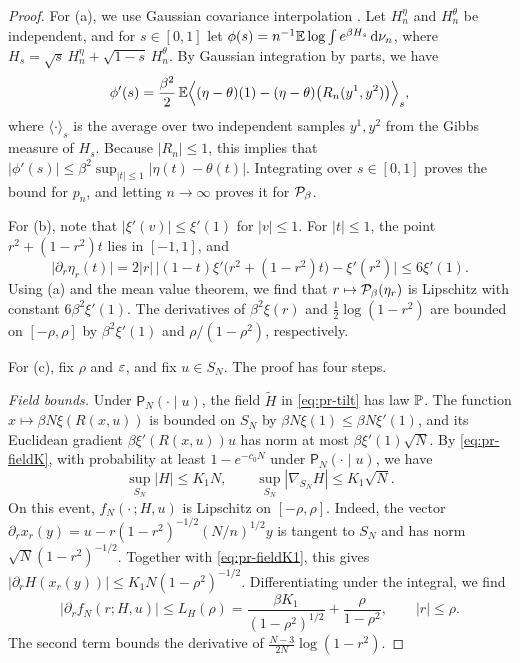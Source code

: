 \begin{proof}
For (a), we use Gaussian covariance interpolation \cite[Section~1.3, Lemma~1.3.1, and Eqs.~(1.55)--(1.60)]{Talagrand2011Volume1}. Let $H_n^\eta$ and $H_n^\theta$ be independent, and for $s\in[0,1]$ let $\phi(s)=n^{-1}\mathbb E\log\int e^{\beta H_s}\,\mathrm d\nu_n$, where $H_s=\sqrt s\,H_n^\eta+\sqrt{1-s}\,H_n^\theta$. By Gaussian integration by parts, we have
\[
\phi'(s)=\frac{\beta^2}{2}\,\mathbb E\Bigl\langle(\eta-\theta)(1)-(\eta-\theta)\bigl(R_n(y^1,y^2)\bigr)\Bigr\rangle_s ,
\]
where $\langle\cdot\rangle_s$ is the average over two independent samples $y^1,y^2$ from the Gibbs measure of $H_s$. Because $|R_n|\le1$, this implies that $|\phi'(s)|\le\beta^2\sup_{|t|\le1}|\eta(t)-\theta(t)|$. Integrating over $s\in[0,1]$ proves the bound for $p_n$, and letting $n\to\infty$ proves it for $\mathcal P_\beta$.

For (b), note that $|\xi'(v)|\le\xi'(1)$ for $|v|\le1$. For $|t|\le1$, the point $r^2+(1-r^2)t$ lies in $[-1,1]$, and
\[
\bigl|\partial_r\eta_r(t)\bigr|=2|r|\,\bigl|(1-t)\xi'\bigl(r^2+(1-r^2)t\bigr)-\xi'(r^2)\bigr|\le 6\xi'(1).
\]
Using (a) and the mean value theorem, we find that $r\mapsto\mathcal P_\beta(\eta_r)$ is Lipschitz with constant $6\beta^2\xi'(1)$. The derivatives of $\beta^2\xi(r)$ and $\frac12\log(1-r^2)$ are bounded on $[-\rho,\rho]$ by $\beta^2\xi'(1)$ and $\rho/(1-\rho^2)$, respectively.

For (c), fix $\rho$ and $\varepsilon$, and fix $u\in S_N$. The proof has four steps.

\emph{Field bounds.} Under $\mathsf P_N(\cdot\mid u)$, the field $\widetilde H$ in \eqref{eq:pr-tilt} has law $\mathbb P$. The function $x\mapsto\beta N\xi(R(x,u))$ is bounded on $S_N$ by $\beta N\xi(1)\le\beta N\xi'(1)$, and its Euclidean gradient $\beta\xi'(R(x,u))u$ has norm at most $\beta\xi'(1)\sqrt N$. By \eqref{eq:pr-fieldK}, with probability at least $1-e^{-c_0N}$ under $\mathsf P_N(\cdot\mid u)$, we have
\begin{equation}\label{eq:pr-fieldK1}
\sup_{S_N}|H|\le K_1N,\qquad\sup_{S_N}|\nabla_{S_N}H|\le K_1\sqrt N .
\end{equation}
On this event, $f_N(\cdot\,;H,u)$ is Lipschitz on $[-\rho,\rho]$. Indeed, the vector $\partial_rx_r(y)=u-r(1-r^2)^{-1/2}(N/n)^{1/2}y$ is tangent to $S_N$ and has norm $\sqrt N(1-r^2)^{-1/2}$. Together with \eqref{eq:pr-fieldK1}, this gives $|\partial_rH(x_r(y))|\le K_1N(1-\rho^2)^{-1/2}$. Differentiating under the integral, we find
\begin{equation}\label{eq:pr-LH}
\bigl|\partial_rf_N(r;H,u)\bigr|\le L_H(\rho)=\frac{\beta K_1}{(1-\rho^2)^{1/2}}+\frac{\rho}{1-\rho^2},\qquad|r|\le\rho .
\end{equation}
The second term bounds the derivative of $\frac{N-3}{2N}\log(1-r^2)$.


\end{proof}
